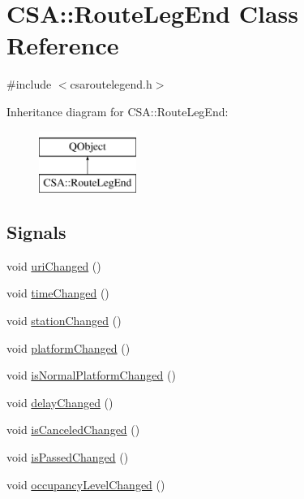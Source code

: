 \hypertarget{classCSA_1_1RouteLegEnd}{}\section{C\+SA\+:\+:Route\+Leg\+End Class Reference}
\label{classCSA_1_1RouteLegEnd}


{\ttfamily \#include $<$csaroutelegend.\+h$>$}

Inheritance diagram for C\+SA\+:\+:Route\+Leg\+End\+:\begin{figure}[H]
\begin{center}
\leavevmode
\includegraphics[height=2.000000cm]{classCSA_1_1RouteLegEnd}
\end{center}
\end{figure}
\subsection*{Signals}
\begin{DoxyCompactItemize}
\item 
void \mbox{\hyperlink{classCSA_1_1RouteLegEnd_a7b076ed1ca3388fc45fd7445a3e28fc6}{uri\+Changed}} ()
\item 
void \mbox{\hyperlink{classCSA_1_1RouteLegEnd_a3e72a28f87df8e3b87c8216faf183985}{time\+Changed}} ()
\item 
void \mbox{\hyperlink{classCSA_1_1RouteLegEnd_ad9cf094a7ca6cb658eef22745bccde12}{station\+Changed}} ()
\item 
void \mbox{\hyperlink{classCSA_1_1RouteLegEnd_a5ac2ad71e228b4f525d6a63f55c62b6f}{platform\+Changed}} ()
\item 
void \mbox{\hyperlink{classCSA_1_1RouteLegEnd_ae84dbef16916f8a23b528906620b628f}{is\+Normal\+Platform\+Changed}} ()
\item 
void \mbox{\hyperlink{classCSA_1_1RouteLegEnd_a68c581c134a26e25daf080d393b0ff76}{delay\+Changed}} ()
\item 
void \mbox{\hyperlink{classCSA_1_1RouteLegEnd_aa11ab3e90ebb2e920b2a0b0517871f73}{is\+Canceled\+Changed}} ()
\item 
void \mbox{\hyperlink{classCSA_1_1RouteLegEnd_a2af1d9d5f71a85c19790b356fdfe0c33}{is\+Passed\+Changed}} ()
\item 
void \mbox{\hyperlink{classCSA_1_1RouteLegEnd_a192aa2d98e40a2f19fa332fe3a65efac}{occupancy\+Level\+Changed}} ()
\end{DoxyCompactItemize}
